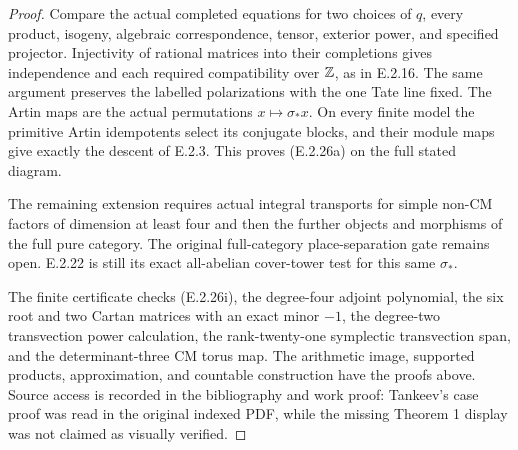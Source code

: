 \begin{proof}
Compare the actual completed equations
for two choices of \(q\), every product,
isogeny, algebraic correspondence, tensor,
exterior power, and specified projector.
Injectivity of rational matrices into
their completions gives independence
and each required compatibility over
\(\mathbb Z\), as in E.2.16. The same argument
preserves the labelled polarizations
with the one Tate line fixed. The
Artin maps are the actual permutations
\(x\mapsto\sigma_*x\). On every finite
model the primitive Artin idempotents
select its conjugate blocks, and their
module maps give exactly the descent
of E.2.3. This proves (E.2.26a) on
the full stated diagram.

The remaining extension requires actual
integral transports for simple non-CM
factors of dimension at least four and
then the further objects and morphisms
of the full pure category. The original
full-category place-separation gate
remains open. E.2.22 is still its exact
all-abelian cover-tower test for this
same \(\sigma_*\).

The finite certificate
checks (E.2.26i), the degree-four
adjoint polynomial, the six root and
two Cartan matrices with an exact
minor \(-1\), the degree-two
transvection power calculation, the
rank-twenty-one symplectic transvection
span, and the determinant-three CM
torus map. The arithmetic image,
supported products, approximation,
and countable construction have the
proofs above. Source access is recorded
in the bibliography and work proof:
Tankeev's case proof was read in the
original indexed PDF, while the missing
Theorem 1 display was not claimed as
visually verified.
\end{proof}
